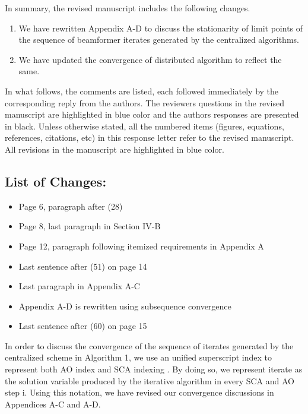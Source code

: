 In summary, the revised manuscript includes the following changes.
\begin{enumerate}
	\item We have rewritten Appendix A-D to discuss the stationarity of limit points of the sequence of beamformer iterates generated by the centralized algorithms.
	\item We have updated the convergence of distributed algorithm to reflect the same.
\end{enumerate}

In what follows, the comments are listed, each followed immediately by the corresponding reply from the authors. The reviewers questions in the revised manuscript are highlighted in blue color and the authors responses are presented in black. Unless otherwise stated, all the numbered items (figures, equations, references, citations, etc) in this response letter refer to the revised manuscript. All revisions in the manuscript are highlighted in blue color.

\subsection*{List of Changes:}
\vspace*{1eM}
\begin{itemize}
	\item Page 6, paragraph after (28)
	\item Page 8, last paragraph in Section IV-B
	\item Page 12, paragraph following itemized requirements in Appendix A
	\item Last sentence after (51) on page 14
	\item Last paragraph in Appendix A-C
	\item Appendix A-D is rewritten using subsequence convergence
	\item Last sentence after (60) on page 15
\end{itemize}

\vspace{1eM}
In order to discuss the convergence of the sequence of iterates generated by the centralized scheme in Algorithm 1, we use an unified superscript index  to represent both \ac{AO} index  and \ac{SCA} indexing . By doing so, we represent iterate  as the solution variable produced by the iterative algorithm in every \ac{SCA}  and \ac{AO} step {i}. Using this notation, we have revised our convergence discussions in Appendices A-C and A-D. 
